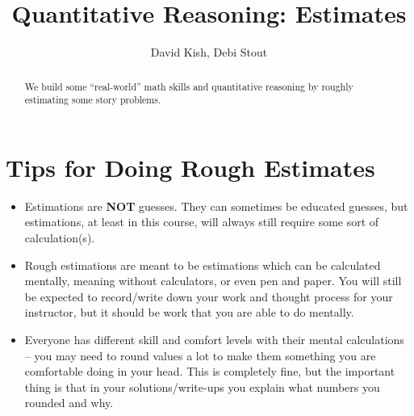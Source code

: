 \documentclass{ximera}
\author{David Kish, Debi Stout}
\title{Quantitative Reasoning: Estimates}
\begin{document}
\begin{abstract}
We build some ``real-world'' math skills and quantitative reasoning by roughly estimating some story problems.
\end{abstract}
\maketitle




\section{Tips for Doing Rough Estimates} 
\begin{itemize}
\item Estimations are \textbf{NOT} guesses.  They can sometimes be educated guesses, but estimations, at least in this course, will always still require some sort of calculation(s).
\item Rough estimations are meant to be estimations which can be calculated mentally, meaning without calculators, or even pen and paper.  You will still be expected to record/write down your work and thought process for your instructor, but it should be work that you are able to do mentally.
\item Everyone has different skill and comfort levels with their mental calculations -- you may need to round values a lot to make them something you are comfortable doing in your head.  This is completely fine, but the important thing is that in your solutions/write-ups you explain what numbers you rounded and why.
\end{itemize}
\end{document}
